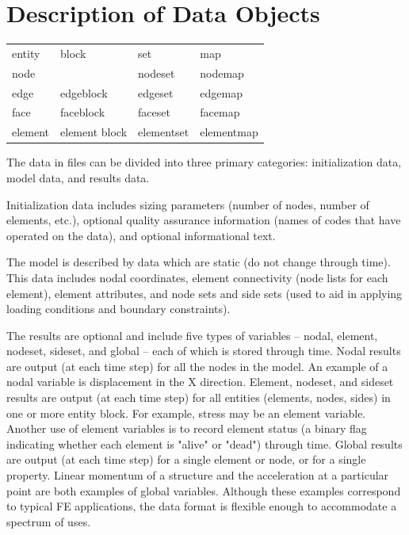 \chapter{Description of Data Objects}

\begin{tabular}{llll}
entity  & block         & set        & map    \\
node    &               & nodeset    & nodemap \\
edge    & edgeblock     & edgeset    & edgemap  \\
face    & faceblock     & faceset    & facemap   \\
element & element block & elementset & elementmap \\
\end{tabular}

The data in \exo{} files can be divided into three primary categories:
initialization data, model data, and results data.

Initialization data includes sizing parameters (number of
nodes, number of elements, etc.), optional quality assurance
information (names of codes that have operated on the data),
and optional informational text.

The model is described by data which are static (do not change
through time). This data includes nodal coordinates, element
connectivity (node lists for each element), element attributes,
and node sets and side sets (used to aid in applying loading
conditions and boundary constraints).

The results are optional and include five types of variables -- nodal,
element, nodeset, sideset, and global -- each of which is stored
through time. Nodal results are output (at each time step) for all the
nodes in the model. An example of a nodal variable is displacement in
the X direction. Element, nodeset, and sideset results are output (at
each time step) for all entities (elements, nodes, sides) in one or
more entity block. For example, stress may be an element
variable. Another use of element variables is to record element status
(a binary flag indicating whether each element is "alive" or "dead")
through time. Global results are output (at each time step) for a
single element or node, or for a single property. Linear momentum of a
structure and the acceleration at a particular point are both examples
of global variables. Although these examples correspond to typical FE
applications, the data format is flexible enough to accommodate a
spectrum of uses.

